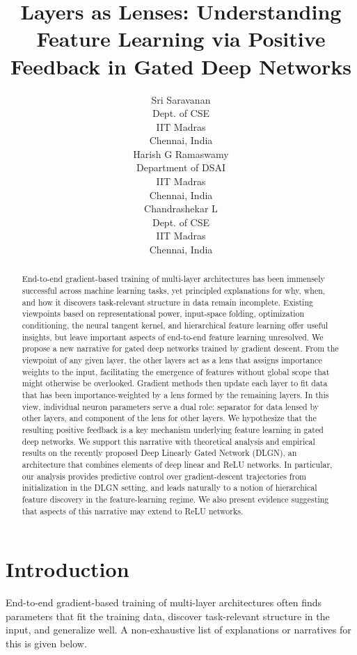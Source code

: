 \documentclass{article}
\title{Layers as Lenses: Understanding Feature Learning via Positive Feedback in Gated Deep Networks}
\author{%
   Sri Saravanan \\
   Dept. of CSE\\
   IIT Madras\\
   Chennai, India \\
    \And
    Harish G Ramaswamy \\
    Department of DSAI \\
	IIT Madras\\
    Chennai, India \\
    \And
    Chandrashekar L \\
   Dept. of CSE\\
   IIT Madras\\
   Chennai, India \\
 }
\theoremstyle{plain}
\theoremstyle{definition}
\theoremstyle{remark}
\newcommand{\1}{{\mathbf 1}}
\newcommand{\0}{{\mathbf 0}}
\renewcommand{\>}{{\rightarrow}}
\begin{document}
\maketitle

\begin{abstract}

End-to-end gradient-based training of multi-layer architectures has been immensely successful across machine learning tasks, yet principled explanations for why, when, and how it discovers task-relevant structure in data remain incomplete. Existing viewpoints based on representational power, input-space folding, optimization conditioning, the neural tangent kernel, and hierarchical feature learning offer useful insights, but leave important aspects of end-to-end feature learning unresolved. We propose a new narrative for gated deep networks trained by gradient descent. From the viewpoint of any given layer, the other layers act as a lens that assigns importance weights to the input, facilitating the emergence of features without global scope that might otherwise be overlooked. Gradient methods then update each layer to fit data that has been importance-weighted by a lens formed by the remaining layers. In this view, individual neuron parameters serve a dual role: separator for data lensed by other layers, and component of the lens for other layers. We hypothesize that the resulting positive feedback is a key mechanism underlying feature learning in gated deep networks. We support this narrative with theoretical analysis and empirical results on the recently proposed Deep Linearly Gated Network (DLGN), an architecture that combines elements of deep linear and ReLU networks. In particular, our analysis provides predictive control over gradient-descent trajectories from initialization in the DLGN setting, and leads naturally to a notion of hierarchical feature discovery in the feature-learning regime. We also present evidence suggesting that aspects of this narrative may extend to ReLU networks.

\end{abstract}

\section{Introduction}

End-to-end gradient-based training of multi-layer architectures often finds parameters that fit the training data, discover task-relevant structure in the input, and generalize well. A non-exhaustive list of explanations or narratives for this is given below.
\end{document}
